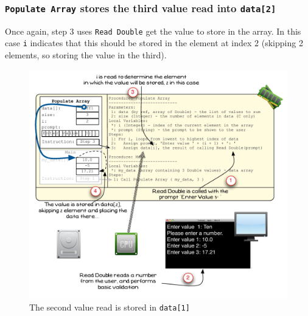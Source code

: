 

\clearpage
\subsubsection{\texttt{Populate Array} stores the third value read into \texttt{data[2]}} %
\label{ssub:populate_array_stores_the_third_value_read_into_data[2]}

Once again, step 3 uses \texttt{Read Double} get the value to store in the array. In this case \texttt{i} indicates that this should be stored in the element at index 2 (skipping 2 elements, so storing the value in the third).

\begin{figure}[htbp]
   \centering
   \includegraphics[width=\textwidth]{./topics/arrays/images/PopulateArray11} 
   \caption{The second value read is stored in \texttt{data[1]}}
   \label{fig:populate-array-vis-11}
\end{figure}

